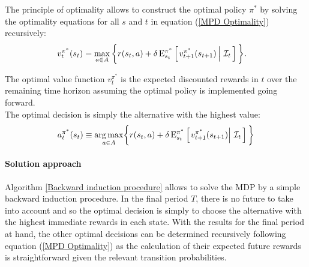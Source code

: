 \noindent The principle of optimality allows to construct the optimal policy $\pi^*$ by solving the optimality equations for all $s$ and $t$ in equation (\ref{MPD Optimality}) recursively:
%
\begin{align}\label{MPD Optimality}
v^{\pi^*}_t(s_t)  & = \max_{a \in A}\bigg\{ r(s_t, a) + \delta\, \mathrm{E}^{\pi^*}_{s_t} \left[\left.v^{\pi^*}_{t + 1}(s_{t + 1})\,\right\vert\,\mathcal{I}_t\,\right] \bigg\}.
\end{align}

\noindent The optimal value function $v^{\pi^*}_t$ is the expected discounted rewards in $t$ over the remaining time horizon assuming the optimal policy is implemented going forward.\\

\noindent The optimal decision is simply the alternative with the highest value:
%
\begin{align*}
a^{\pi^*}_t(s_t) \equiv \underset{a\in A}{\operatorname*{arg\,max}} \bigg\{ r(s_t, a) + \delta\,\mathrm{E}^{\pi^*}_{s_t} \left[\left.v^{\pi^*}_{t + 1}(s_{t + 1})\right\vert\,\mathcal{I}_t\,\right] \bigg\}
\end{align*}

\paragraph{Solution approach} Algorithm \ref{Backward induction procedure} allows to solve the MDP by a simple backward induction procedure. In the final period $T$, there is no future to take into account and so the optimal decision is simply to choose the alternative with the highest immediate rewards in each state. With the results for the final period at hand, the other optimal decisions can be determined recursively following equation (\ref{MPD Optimality}) as the calculation of their expected future rewards is straightforward given the relevant transition probabilities.

\vspace{0.5cm}\FloatBarrier
